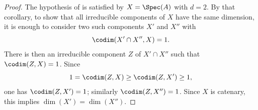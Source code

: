\begin{proof}
The hypothesis of  is satisfied by
$X=\Spec(A)$ with $d=2$.  By that corollary, to show that all
irreducible components of $X$ have the same dimension, it is
enough to consider two such components $X'$ and $X''$ with
\[
  \codim(X'\cap X'',X)=1.
\]
There is then an irreducible component $Z$ of $X'\cap X''$ such
that $\codim(Z,X)=1$.  Since
\[
  1=\codim(Z,X)\geq\codim(Z,X')\geq1,
\]
one has $\codim(Z,X')=1$; similarly
$\codim(Z,X'')=1$.  Since $X$ is catenary, this implies
$\dim(X')=\dim(X'')$.
\end{proof}
